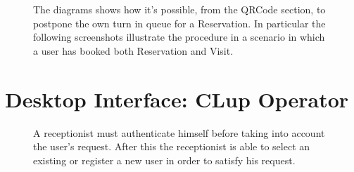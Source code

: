 \begin{figure}[H]
  \label{QRCode_handle}
  \centering
    \caption{The diagrams shows how it's possible, from the QRCode section, to postpone the own turn in queue for a Reservation. In particular the following screenshots illustrate the procedure in a scenario in which a user has booked both Reservation and Visit.}
\end{figure}

\section{Desktop Interface: CLup Operator}


\begin{figure}[H]
  \label{Receptionist1}
  \centering
    \caption{A receptionist must authenticate himself before taking into account the user's request. After this the receptionist is able to select an existing or register a new user in order to satisfy his request.}
\end{figure}


